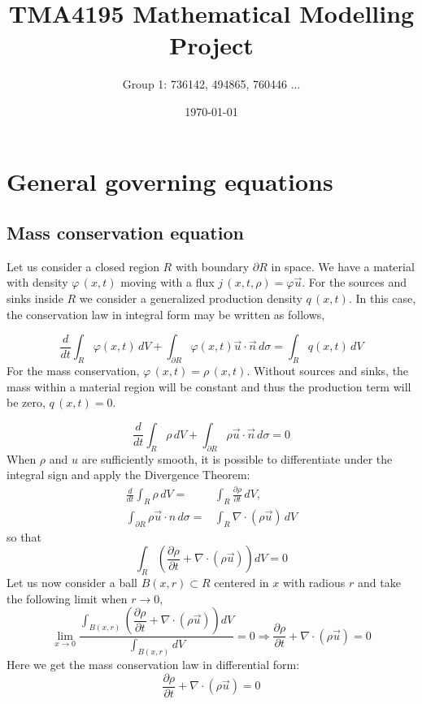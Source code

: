 \documentclass{article}
\title{TMA4195 Mathematical Modelling Project}
\author{Group 1: 736142, 494865, 760446 ...}
\date{\today}
\begin{document}
\maketitle

\section{General governing equations}
\subsection{Mass conservation equation}

Let us consider a closed region $R$ with boundary $\partial R$ in space. We have a material with density $\varphi \, (x,t)$  moving with a flux $j\, (x,t,\rho)=\varphi \vec{u}$. For the sources and sinks inside $R$ we consider a generalized production density $q\, (x,t)$. In this case, the conservation law in integral form may be written as follows,

\begin{equation}
\label{general_balance}
\dfrac{d}{dt}\int_R \varphi(x,t) \, dV + \int_{\partial R} \varphi(x,t) \vec{u}\cdot \vec{n} \, d\sigma=\int_R q(x,t) \, dV
\end{equation}
For the mass conservation, $\varphi \, (x,t)=\rho \, (x,t)$. Without sources and sinks, the mass within a material region will be constant and thus the production term will be zero, $q\, (x,t)=0$.

\begin{equation}
\dfrac{d}{dt}\int_R \rho \, dV + \int_{\partial R} \rho   \vec{u}\cdot \vec{n} \, d\sigma=0
\end{equation}
When $\rho$ and $u$ are sufficiently smooth, it is possible to differentiate under the integral sign and apply the Divergence Theorem:
\begin{align}
\label{differential}
\frac{d}{dt}\int_R \rho \, dV =& \int_R \frac{\partial \rho}{\partial t} \, dV,\\
\label{divergence}
\int_{\partial R} \rho \vec{u} \cdot n \, d\sigma =& \int_R \nabla \cdot (\rho \vec{u})\, dV
\end{align}
so that
\begin{equation}
\int_R \left( \dfrac{\partial \rho}{\partial t} + \nabla \cdot (\rho \vec{u}) \right) dV=0
\end{equation}
Let us now consider a ball $B(x,r) \subset R$ centered in $x$ with radious $r$ and take the following limit when $r \rightarrow 0$,
\begin{equation}
\label{ball}
\lim_{x \to 0} \frac{\int_{B(x,r)} \left( \dfrac{\partial \rho}{\partial t} + \nabla \cdot (\rho \vec{u}) \right) dV}{\int_{B(x,r)}dV}=0 \Rightarrow \dfrac{\partial \rho}{\partial t} + \nabla \cdot (\rho \vec{u})=0
\end{equation}
Here we get the mass conservation law in differential form:
\begin{equation}
\label{mass}
\boxed{
\dfrac{\partial \rho}{\partial t} + \nabla \cdot (\rho \vec{u})=0
}
\end{equation}
\end{document}
